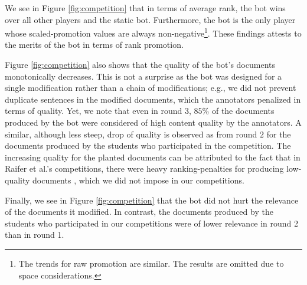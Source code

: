 We see in Figure \ref{fig:competition} that
in terms of average rank, the bot wins over all other
players and the static bot. Furthermore, the bot is the only player whose scaled-promotion values are
always non-negative\footnote{The trends for raw promotion are similar. The results are omitted due to space considerations.}. These findings attests to the merits of the bot
in terms of rank promotion.

Figure \ref{fig:competition} also shows that the quality of the
bot's documents monotonically decreases. This is not a surprise as the
bot was designed for a single modification rather than a chain of
modifications; e.g., we did not prevent duplicate sentences in the modified documents, which the annotators penalized in terms of
quality. Yet, we note that even in round $3$, $85\%$ of the documents
produced by the bot were considered of high content quality
by the annotators.  A similar, although less steep, drop of quality is
observed as from round $2$ for the documents produced by the students
who participated in the competition. The increasing quality for the
planted documents can be attributed to the fact that in Raifer et
al.'s competitions, there were heavy ranking-penalties for producing
low-quality documents \cite{Raifer+al:17a}, which we did not impose in
our competitions.

Finally, we see in Figure \ref{fig:competition} that the bot did not
hurt the relevance of the documents it modified. In contrast, the documents produced by the students
who participated in our competitions were of lower relevance in round 2 than in round 1.



